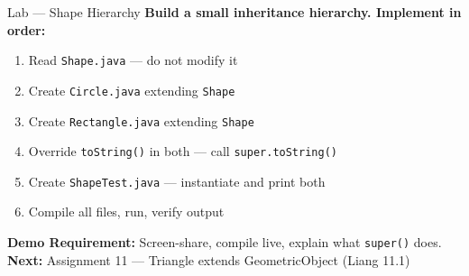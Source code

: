 \documentclass{beamer}
\begin{document}
\begin{frame}{Lab --- Shape Hierarchy}
\textbf{Build a small inheritance hierarchy. Implement in order:}
\begin{enumerate}
  \item Read \texttt{Shape.java} --- do not modify it
  \item Create \texttt{Circle.java} extending \texttt{Shape}
  \item Create \texttt{Rectangle.java} extending \texttt{Shape}
  \item Override \texttt{toString()} in both --- call \texttt{super.toString()}
  \item Create \texttt{ShapeTest.java} --- instantiate and print both
  \item Compile all files, run, verify output
\end{enumerate}
\vspace{0.3cm}
\textbf{Demo Requirement:} Screen-share, compile live, explain what \texttt{super()} does.\\
\vspace{0.3cm}
\textbf{Next:} Assignment 11 --- Triangle extends GeometricObject (Liang 11.1)
\end{frame}
\end{document}
